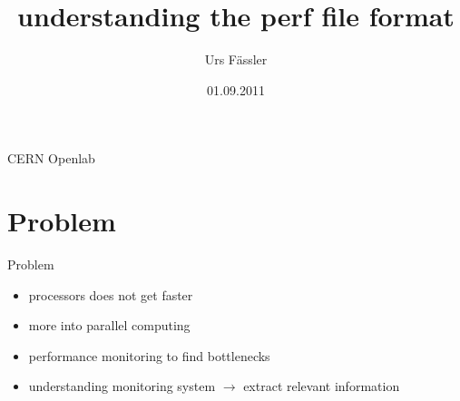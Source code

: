 
\usepackage[utf8]{inputenc}
\usepackage{amsmath}
\usepackage{amsfonts}
\usepackage{amssymb}
\usepackage{multicol}
\usepackage{graphicx}
\usepackage{tikz}
\usetikzlibrary{arrows,positioning,shapes}
\usepackage{listings}
\usepackage{multicol}
\usepackage{appendixnumberbeamer}
\usepackage{pstricks}
\usepackage{marvosym}
\usepackage{biblatex}

\newcommand{\code}[1]{\texttt{#1}}

\title{understanding the perf file format}
\author{Urs F\"assler}
\date{01.09.2011}
\institute
{
  CERN Openlab
}

%


\beamertemplatenavigationsymbolsempty


\begin{frame}[plain]
  \titlepage
\end{frame}

\setcounter{framenumber}{0}

\section{Problem}
\begin{frame}{Problem}
\begin{itemize}
  \item processors does not get faster
  \item more into parallel computing
  \item performance monitoring to find bottlenecks
  \item understanding monitoring system $\rightarrow$ extract relevant information
\end{itemize}
\end{frame}

